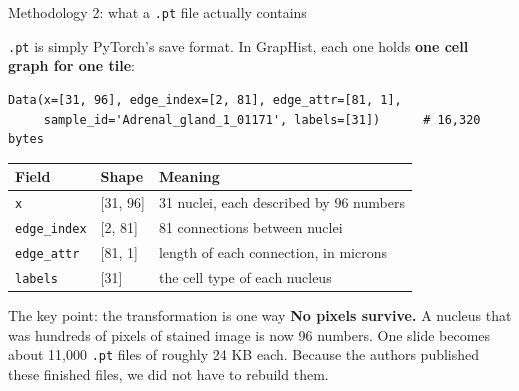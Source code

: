 \documentclass[aspectratio=169,11pt]{beamer}
\begin{document}
\begin{frame}[fragile]{Methodology 2: what a \texttt{.pt} file actually contains}

  \texttt{.pt} is simply PyTorch's save format. In GrapHist, each one holds
  \textbf{one cell graph for one tile}:

  \vspace{0.4em}
{\footnotesize
\begin{verbatim}
Data(x=[31, 96], edge_index=[2, 81], edge_attr=[81, 1],
     sample_id='Adrenal_gland_1_01171', labels=[31])      # 16,320 bytes
\end{verbatim}
}

  \vspace{0.2em}
  \begin{center}\footnotesize
  \begin{tabular}{@{}lll@{}}
    \toprule
    \textbf{Field} & \textbf{Shape} & \textbf{Meaning} \\
    \midrule
    \texttt{x}          & [31, 96] & 31 nuclei, each described by 96 numbers \\
    \texttt{edge\_index}& [2, 81]  & 81 connections between nuclei \\
    \texttt{edge\_attr} & [81, 1]  & length of each connection, in microns \\
    \texttt{labels}     & [31]     & the cell type of each nucleus \\
    \bottomrule
  \end{tabular}
  \end{center}

  \vspace{0.5em}
  \begin{alertblock}{The key point: the transformation is one way}
    \textbf{No pixels survive.} A nucleus that was hundreds of pixels of stained
    image is now 96 numbers. One slide becomes about 11,000 \texttt{.pt} files of
    roughly 24 KB each. Because the authors published these finished files, we
    did not have to rebuild them.
  \end{alertblock}

\end{frame}
\end{document}
